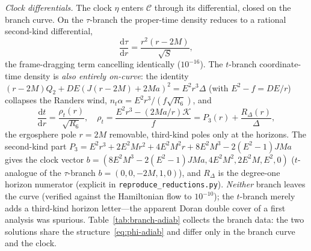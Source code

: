 \documentclass[
    aps, prd, twocolumn, superscriptaddress,
    showpacs, nofootinbib, floatfix
]{revtex4-2}
\newcommand{\dd}{\mathrm{d}}
\begin{document}
\emph{Clock differentials.} The clock $\eta$ enters $\mathcal{C}$ through its
differential, closed on the branch curve. On the $\tau$-branch the proper-time
density reduces to a rational second-kind differential,
\begin{equation}
    \frac{\dd\tau}{\dd r}=\frac{r^2(r-2M)}{\sqrt{S}},
    \label{eq:clock-tau}
\end{equation}
the frame-dragging term cancelling identically ($10^{-16}$). The $t$-branch
coordinate-time density is \emph{also entirely on-curve}: the identity
$(r-2M)Q_2+DE(J(r-2M)+2Ma)^2=E^2r^3\Delta$ (with $E^2-f=DE/r$) collapses the Randers
wind, $n_t\alpha=E^2r^3/(f\sqrt{R_6})$, and
\begin{equation}
    \frac{\dd t}{\dd r}=\frac{\rho_t(r)}{\sqrt{R_6}},\quad
    \rho_t=\frac{E^2r^3-(2Ma/r)\mathcal K}{f}=P_3(r)+\frac{R_\Delta(r)}{\Delta},
    \label{eq:clock-t}
\end{equation}
the ergosphere pole $r=2M$ removable, third-kind poles only at the horizons. The
second-kind part $P_3=E^2r^3+2E^2Mr^2+4E^2M^2r+8E^2M^3-2(E^2-1)JMa$ gives the clock
vector $b=(8E^2M^3-2(E^2-1)JMa,4E^2M^2,2E^2M,E^2,0)$ ($t$-analogue of the $\tau$-branch
$b=(0,0,-2M,1,0)$), and $R_\Delta$ is the degree-one horizon numerator (explicit in
\texttt{reproduce\_reductions.py}). \emph{Neither} branch leaves the curve (verified
against the Hamiltonian flow to $10^{-10}$); the $t$-branch merely adds a third-kind
horizon letter---the apparent Doran double cover of a first analysis was spurious.
Table~\ref{tab:branch-adiab} collects the branch data: the two solutions share the
structure~\eqref{eq:phi-adiab} and differ only in the branch curve and the clock.
\end{document}
